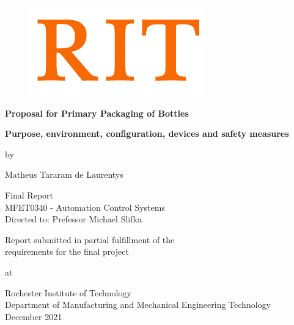 \begin{titlepage}
\begin{figure}[H]
    \hspace*{-1.0cm}
    \vspace*{-0.5cm}
    \includegraphics[scale=1]{images/logo_rit.jpg}\\
\end{figure}

\begin{center}
    \vspace*{2cm}
    
    {\LARGE \textbf{Proposal for Primary Packaging of Bottles}}
    
    \vspace{0.5cm}
    \textbf{Purpose, environment, configuration, devices and safety measures}
    
	\vspace{1cm}
	 by
    \vspace{1cm}
    
   Matheus Tararam de Laurentys
\end{center}

\vspace{1cm}

\begin{center}   
	{\large Final Report \\ 
		MFET0340 - Automation Control Systems} \\
	\vspace{0.5cm}
	Directed to: Prefessor Michael Slifka \\
	
\end{center}

\vspace{1cm}

\begin{center}
	Report submitted in partial fulfillment of the\\
	requirements for the final project

	\vspace{1.0cm}
	at
	\vspace{1cm}
	
	Rochester Institute of Technology \\
	Department of Manufacturing and Mechanical Engineering Technology \\
	December 2021
\end{center}

\end{titlepage}